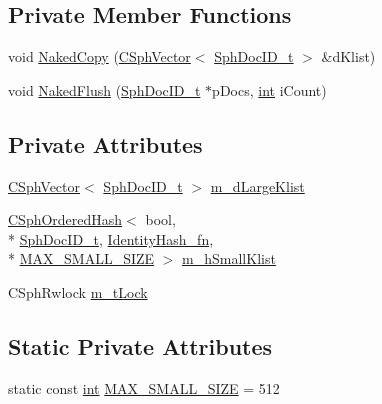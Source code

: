 \subsection*{Private Member Functions}
\begin{DoxyCompactItemize}
\item 
void \hyperlink{classCSphKilllist_aeb0ec2a7b4629bd3a8622954526ba6a4}{Naked\-Copy} (\hyperlink{classCSphVector}{C\-Sph\-Vector}$<$ \hyperlink{sphinx_8h_a3176771631c12a9e4897272003e6b447}{Sph\-Doc\-I\-D\-\_\-t} $>$ \&d\-Klist)
\item 
void \hyperlink{classCSphKilllist_aac1fa835b8501d7895a0061735127d4a}{Naked\-Flush} (\hyperlink{sphinx_8h_a3176771631c12a9e4897272003e6b447}{Sph\-Doc\-I\-D\-\_\-t} $\ast$p\-Docs, \hyperlink{sphinxexpr_8cpp_a4a26e8f9cb8b736e0c4cbf4d16de985e}{int} i\-Count)
\end{DoxyCompactItemize}
\subsection*{Private Attributes}
\begin{DoxyCompactItemize}
\item 
\hyperlink{classCSphVector}{C\-Sph\-Vector}$<$ \hyperlink{sphinx_8h_a3176771631c12a9e4897272003e6b447}{Sph\-Doc\-I\-D\-\_\-t} $>$ \hyperlink{classCSphKilllist_aa8e0fcba4bd5f62efe486f8106f80ec9}{m\-\_\-d\-Large\-Klist}
\item 
\hyperlink{classCSphOrderedHash}{C\-Sph\-Ordered\-Hash}$<$ bool, \\*
\hyperlink{sphinx_8h_a3176771631c12a9e4897272003e6b447}{Sph\-Doc\-I\-D\-\_\-t}, \hyperlink{structIdentityHash__fn}{Identity\-Hash\-\_\-fn}, \\*
\hyperlink{classCSphKilllist_a8ff68f7e3cf4fd9b7d78647315babf45}{M\-A\-X\-\_\-\-S\-M\-A\-L\-L\-\_\-\-S\-I\-Z\-E} $>$ \hyperlink{classCSphKilllist_ae3de84a11c91101fd41bb66ca913d34a}{m\-\_\-h\-Small\-Klist}
\item 
C\-Sph\-Rwlock \hyperlink{classCSphKilllist_a44684cc99c018e1365eec9b070d42731}{m\-\_\-t\-Lock}
\end{DoxyCompactItemize}
\subsection*{Static Private Attributes}
\begin{DoxyCompactItemize}
\item 
static const \hyperlink{sphinxexpr_8cpp_a4a26e8f9cb8b736e0c4cbf4d16de985e}{int} \hyperlink{classCSphKilllist_a8ff68f7e3cf4fd9b7d78647315babf45}{M\-A\-X\-\_\-\-S\-M\-A\-L\-L\-\_\-\-S\-I\-Z\-E} = 512
\end{DoxyCompactItemize}


